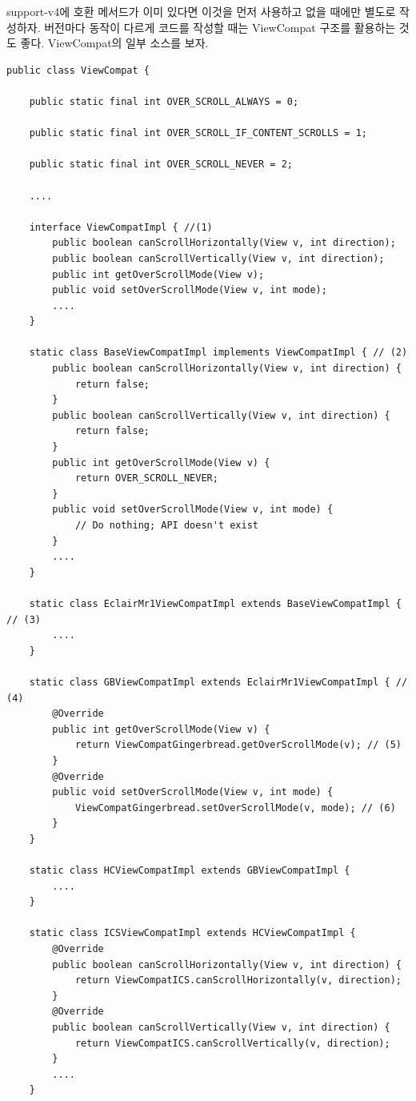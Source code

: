support-v4에 호환 메서드가 이미 있다면 이것을 먼저 사용하고 없을 때에만 별도로 작성하자.
버전마다 동작이 다르게 코드를 작성할 때는 ViewCompat 구조를 활용하는 것도 좋다. ViewCompat의 일부 소스를 보자. 
\begin{lstlisting}[frame=single]
public class ViewCompat {
   
    public static final int OVER_SCROLL_ALWAYS = 0;

    public static final int OVER_SCROLL_IF_CONTENT_SCROLLS = 1;

    public static final int OVER_SCROLL_NEVER = 2;
    
    ....
    
    interface ViewCompatImpl { //(1)
        public boolean canScrollHorizontally(View v, int direction);
        public boolean canScrollVertically(View v, int direction);
        public int getOverScrollMode(View v);
        public void setOverScrollMode(View v, int mode);
        ....
    }

    static class BaseViewCompatImpl implements ViewCompatImpl { // (2)
        public boolean canScrollHorizontally(View v, int direction) {
            return false;
        }
        public boolean canScrollVertically(View v, int direction) {
            return false;
        }
        public int getOverScrollMode(View v) {
            return OVER_SCROLL_NEVER;
        }
        public void setOverScrollMode(View v, int mode) {
            // Do nothing; API doesn't exist
        }
        ....
    }

    static class EclairMr1ViewCompatImpl extends BaseViewCompatImpl { // (3)
        ....
    }

    static class GBViewCompatImpl extends EclairMr1ViewCompatImpl { // (4)
        @Override
        public int getOverScrollMode(View v) {
            return ViewCompatGingerbread.getOverScrollMode(v); // (5)
        }
        @Override
        public void setOverScrollMode(View v, int mode) {
            ViewCompatGingerbread.setOverScrollMode(v, mode); // (6)
        }
    }

    static class HCViewCompatImpl extends GBViewCompatImpl {
      	....
    }

    static class ICSViewCompatImpl extends HCViewCompatImpl {
        @Override
        public boolean canScrollHorizontally(View v, int direction) {
            return ViewCompatICS.canScrollHorizontally(v, direction);
        }
        @Override
        public boolean canScrollVertically(View v, int direction) {
            return ViewCompatICS.canScrollVertically(v, direction);
        }
        ....
    }


\end{lstlisting}
